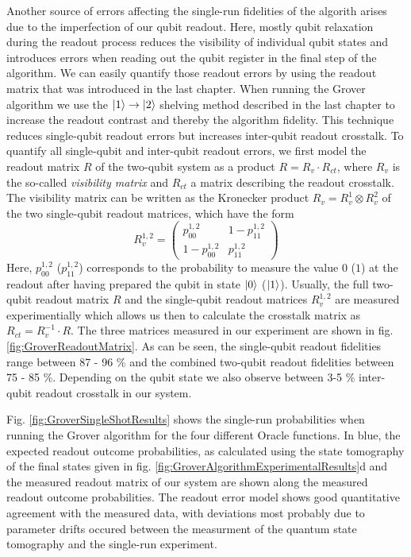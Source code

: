 Another source of errors affecting the single-run fidelities of the algorith arises due to the imperfection of our qubit readout. Here, mostly qubit relaxation during the readout process reduces the visibility of individual qubit states and introduces errors when reading out the qubit register in the final step of the algorithm. We can easily quantify those readout errors by using the readout matrix that was introduced in the last chapter. When running the Grover algorithm we use the $\left| 1 \right>\to\left| 2 \right>$ shelving method described in the last chapter to increase the readout contrast and thereby the algorithm fidelity. This technique reduces single-qubit readout errors but increases inter-qubit readout crosstalk. To quantify all single-qubit and inter-qubit readout errors, we first model the readout matrix $R$ of the two-qubit system as a product $R=R_{v}\cdot R_{ct}$, where $R_{v}$ is the so-called {\it visibility matrix} and $R_{ct}$ a matrix describing the readout crosstalk. The visibility matrix can be written as the Kronecker product $R_{v} = R_{v}^1 \otimes R_{v}^2$ of the two single-qubit readout matrices, which have the form
%
\begin{equation}
R_{v}^{1,2} = \left(
			\begin{array}{cc}
				p_{00}^{1,2} & 1-p_{11}^{1,2} \\
				1-p_{00}^{1,2} & p_{11}^{1,2}
			\end{array}
		\right)
\end{equation}
%
Here, $p_{00}^{1,2}$ ($p_{11}^{1,2}$) corresponds to the probability to measure the value $0$ ($1$) at the readout after having prepared the qubit in state $\left| 0 \right>$ ($\left| 1 \right>$). Usually, the full two-qubit readout matrix $R$ and the single-qubit readout matrices $R_{v}^{1,2}$ are measured experimentially which allows us then to calculate the crosstalk matrix as $R_{ct} = R_{v}^{-1}\cdot R$. The three matrices measured in our experiment are shown in fig. \ref{fig:GroverReadoutMatrix}. As can be seen, the single-qubit readout fidelities range between 87 - 96 \% and the combined two-qubit readout fidelities between 75 - 85 \%. Depending on the qubit state we also observe between 3-5 \% inter-qubit readout crosstalk in our system.

\smallskip

Fig. \ref{fig:GroverSingleShotResults} shows the single-run probabilities when running the Grover algorithm for the four different Oracle functions. In blue, the expected readout outcome probabilities, as calculated using the state tomography of the final states given in fig. \ref{fig:GroverAlgorithmExperimentalResults}d and the measured readout matrix of our system are shown along the measured readout outcome probabilities. The readout error model shows good quantitative agreement with the measured data, with deviations most probably due to parameter drifts occured between the measurment of the quantum state tomography and the single-run experiment.


